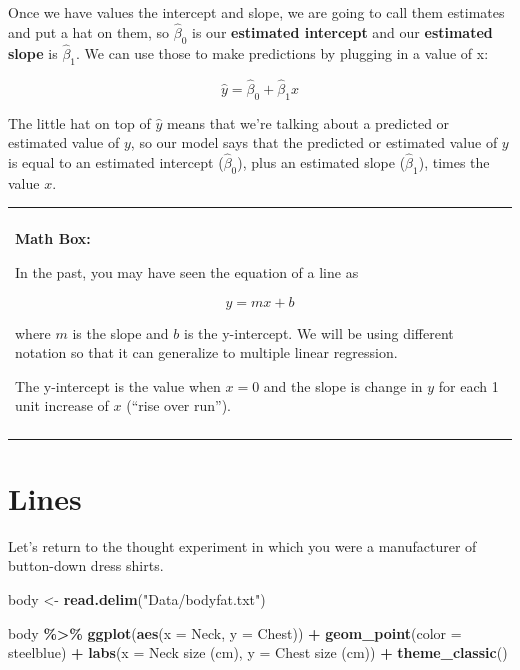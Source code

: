 \documentclass[
]{book}
\newenvironment{Shaded}{\begin{snugshade}}{\end{snugshade}}
\newcommand{\AttributeTok}[1]{\textcolor[rgb]{0.13,0.29,0.53}{#1}}
\newcommand{\FunctionTok}[1]{\textcolor[rgb]{0.13,0.29,0.53}{\textbf{#1}}}
\newcommand{\NormalTok}[1]{#1}
\newcommand{\OtherTok}[1]{\textcolor[rgb]{0.56,0.35,0.01}{#1}}
\newcommand{\SpecialCharTok}[1]{\textcolor[rgb]{0.81,0.36,0.00}{\textbf{#1}}}
\newcommand{\StringTok}[1]{\textcolor[rgb]{0.31,0.60,0.02}{#1}}
\newenvironment{mathbox}
{
    \begin{center}
    
    \begin{tabular}{|p{0.8\textwidth}|}
    \rowcolor{LightYellow}
    \hline\\
    \rowcolor{LightYellow}
    \textbf{Math Box:}
}
{
    \\\rowcolor{LightYellow}
    \\\hline
    \end{tabular} 
    \end{center}
}
\begin{document}
Once we have values the intercept and slope, we are going to call them estimates and put a hat on them, so \(\hat{\beta}_0\) is our \textbf{estimated intercept} and our \textbf{estimated slope} is \(\hat{\beta}_1\). We can use those to make predictions by plugging in a value of x:

\[\hat{y} = \hat{\beta}_0 +\hat{\beta}_1 x\]

The little hat on top of \(\hat{y}\) means that we're talking about a predicted or estimated value of \(y\), so our model says that the predicted or estimated value of \(y\) is equal to an estimated intercept (\(\hat{\beta}_0\)), plus an estimated slope (\(\hat{\beta}_1\)), times the value \(x\).

\begin{mathbox}
In the past, you may have seen the equation of a line as

\[y = mx + b\]

where \(m\) is the slope and \(b\) is the y-intercept. We will be using
different notation so that it can generalize to multiple linear
regression.

The y-intercept is the value when \(x=0\) and the slope is change in
\(y\) for each 1 unit increase of \(x\) (``rise over run'').
\end{mathbox}

\section{Lines}\label{lines}

Let's return to the thought experiment in which you were a manufacturer of button-down dress shirts.

\begin{Shaded}
\begin{Highlighting}[]
\NormalTok{body }\OtherTok{\textless{}{-}} \FunctionTok{read.delim}\NormalTok{(}\StringTok{"Data/bodyfat.txt"}\NormalTok{)}

\NormalTok{body }\SpecialCharTok{\%\textgreater{}\%}
    \FunctionTok{ggplot}\NormalTok{(}\FunctionTok{aes}\NormalTok{(}\AttributeTok{x =}\NormalTok{ Neck, }\AttributeTok{y =}\NormalTok{ Chest)) }\SpecialCharTok{+}
    \FunctionTok{geom\_point}\NormalTok{(}\AttributeTok{color =} \StringTok{\textquotesingle{}steelblue\textquotesingle{}}\NormalTok{) }\SpecialCharTok{+} 
    \FunctionTok{labs}\NormalTok{(}\AttributeTok{x =} \StringTok{\textquotesingle{}Neck size (cm)\textquotesingle{}}\NormalTok{, }\AttributeTok{y =} \StringTok{\textquotesingle{}Chest size (cm)\textquotesingle{}}\NormalTok{) }\SpecialCharTok{+}
    \FunctionTok{theme\_classic}\NormalTok{()}
\end{Highlighting}
\end{Shaded}
\end{document}
